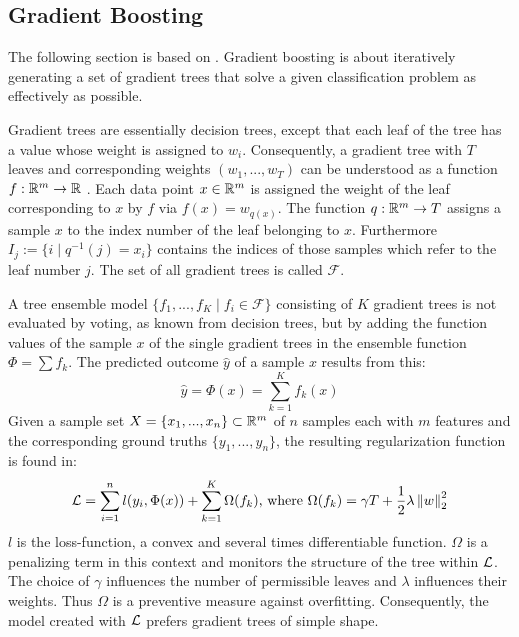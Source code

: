 \subsection{Gradient Boosting}


The following section is based on \cite{Chen16}. Gradient boosting is about iteratively generating a set of gradient trees that solve a given classification problem as effectively as possible.

Gradient trees are essentially decision trees, except that each leaf of the tree has a value whose weight is assigned to $w_i$. Consequently, a gradient tree with $T$ leaves and corresponding weights $(w_1, ... ,w_T)$ can be understood as a function $f: \mathbb{R}^m \to \mathbb{R}$ . Each data point $x \in \mathbb{R}^m$ is assigned the weight of the leaf corresponding to $x$ by $f$ via $f(x) = w_{q(x)}$. The function $q: \mathbb{R}^m \to T$ assigns a sample $x$ to the index number of the leaf belonging to $x$. Furthermore $I_j := \{ i \mid q^{-1}(j)=x_i \}$ contains the indices of those samples which refer to the leaf number $j$. The set of all gradient trees is called $\mathcal{F}$.

A tree ensemble model $\{f_1, ... ,f_K \mid f_i \in \mathcal{F}\}$ consisting of $K$ gradient trees is not evaluated by voting, as known from decision trees, but by adding the function values of the sample $x$ of the single gradient trees in the ensemble function $\Phi = \sum f_k$. The predicted outcome $\hat{y}$ of a sample $x$ results from this:
$$\hat{y} = \Phi(x) = \sum_{k=1}^{K} f_k(x)$$
Given a sample set $X= \{x_1, ..., x_n\} \subset \mathbb{R}^{m} $ of $n$ samples each with $m$ features and the corresponding ground truths $\{y_1, ... ,y_n\}$, the resulting regularization function is found in:	
$$\mathcal{L} = \sum_{i=1}^{n} l(y_i, \Phi(x)) + \sum_{k=1}^{K}\Omega(f_k) \text{,  where } \Omega(f_k) = \gamma T + \frac{1}{2}\lambda \left\| w \right\|_2^2$$
$l$ is the loss-function, a convex and several times differentiable function. $\Omega$ is a penalizing term in this context and monitors the structure of the tree within $\mathcal{L}$. The choice of $\gamma$ influences the number of permissible leaves and $\lambda$ influences their weights. Thus $\Omega$ is a preventive measure against overfitting. Consequently, the model created with $\mathcal{L}$ prefers gradient trees of simple shape.

